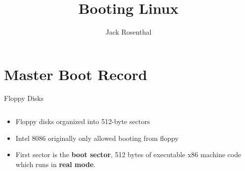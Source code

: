 \documentclass{lug}
\title{Booting Linux}
\author{Jack Rosenthal}
\institute{Mines Linux Users Group}
\begin{document}
\section{Master Boot Record}

\begin{frame}{Floppy Disks}
    \begin{columns}
        \begin{column}{0.7\textwidth}
            \begin{itemize}[<+->]
                \item Floppy disks organized into 512-byte sectors
                \item Intel 8086 originally only allowed booting from floppy
                \item First sector is the \textbf{boot sector}, 512 bytes of
                    executable x86 machine code which runs in \textbf{real
                    mode}.
            \end{itemize}
        \end{column}
        \begin{column}{0.3\textwidth}

\end{column}
\end{columns}
\end{frame}
\end{document}
